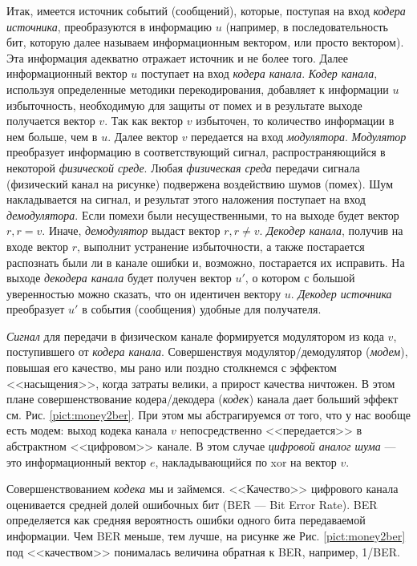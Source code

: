 Итак, имеется источник событий (сообщений), которые, поступая на вход \emph{кодера источника}, преобразуются в информацию $u$ (например, в последовательность бит, которую далее называем информационным вектором, или просто вектором). Эта информация адекватно отражает источник и не более того. Далее информационный вектор $u$ поступает на вход \emph{кодера канала}. \emph{Кодер канала}, используя определенные методики перекодирования, добавляет к информации $u$ избыточность, необходимую для защиты от помех и в результате выходе получается вектор $v$. Так как вектор $v$ избыточен, то количество информации в нем больше, чем в $u$. Далее вектор $v$ передается на вход \emph{модулятора}. \emph{Модулятор } преобразует информацию в соответствующий сигнал, распространяющийся в некоторой \emph{физической среде}. Любая \emph{физическая среда} передачи сигнала (физический канал на рисунке) подвержена воздействию шумов (помех). Шум накладывается на сигнал, и результат этого наложения поступает на вход \emph{демодулятора}. Если помехи были несущественными, то на выходе будет вектор $r, r=v$. Иначе, \emph{демодулятор} выдаст вектор $r, r\neq v$. \emph{Декодер канала}, получив на входе вектор $r$, выполнит устранение избыточности, а также постарается распознать были ли в канале ошибки и, возможно, постарается их исправить. На выходе \emph{декодера канала} будет получен вектор $u'$, о котором с большой уверенностью можно сказать, что он идентичен вектору $u$. \emph{Декодер источника} преобразует $u'$ в события (сообщения) удобные для получателя.

\emph{Сигнал} для передачи в физическом канале формируется модулятором из кода $v$, поступившего от \emph{кодера канала}. Совершенствуя модулятор/демодулятор (\emph{модем}), повышая его качество, мы рано или поздно столкнемся с эффектом <<насыщения>>, когда затраты велики, а прирост качества ничтожен. В этом плане совершенствование кодера/декодера (\emph{кодек}) канала дает больший эффект см. Рис. \ref{pict:money2ber}. При этом мы абстрагируемся от того, что у нас вообще есть модем: выход кодека канала $v$ непосредственно <<передается>> в абстрактном <<цифровом>> канале. В этом случае \emph{цифровой аналог шума} --- это информационный вектор $e$, накладывающийся по xor на вектор $v$.

Совершенствованием \emph{кодека} мы и займемся. <<Качество>> цифрового канала оценивается средней долей ошибочных бит (BER --- Bit Error Rate). BER определяется как средняя вероятность ошибки одного бита передаваемой информации. Чем BER меньше, тем лучше, на рисунке же Рис. \ref{pict:money2ber} под <<качеством>> понималась величина обратная к BER, например, 1/BER.

